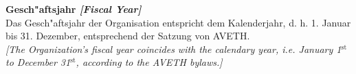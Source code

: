 \documentclass[10pt]{article}
\newcounter{qcounter}
\renewcommand{\section}[1]{\pagebreak[3]%
    \vspace{1.3\baselineskip}%
    \phantomsection\addcontentsline{toc}{section}{#1}%
    \noindent\llap{\scshape\smash{\parbox[t]{\marginparwidth}{\hyphenpenalty=10000\raggedright #1}}}%
    \vspace{-\baselineskip}\par}
\begin{document}
\begin{list}{{\bf Artikel :~}}{}
\item {\bf Gesch"aftsjahr {\it[Fiscal Year]}}\\
Das Gesch"aftsjahr der Organisation entspricht dem Kalenderjahr, d. h. 1. Januar bis 31. Dezember, entsprechend der Satzung von AVETH.\\
{\it[The Organization's fiscal year coincides with the calendary year, i.e. January 1$^{\mathrm{st}}$ to December 31$^{\mathrm{st}}$, according to the AVETH bylaws.]}


 



\end{list}
\end{document}
